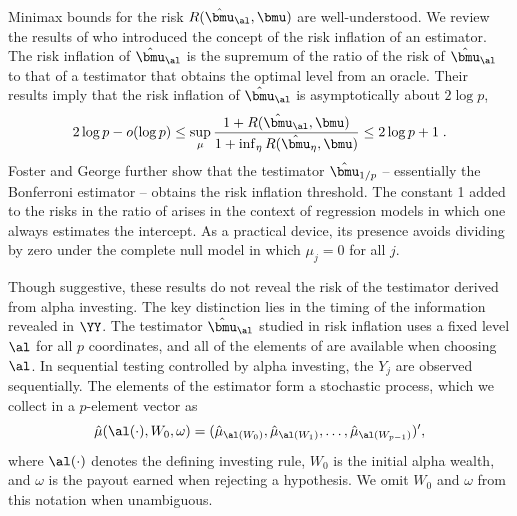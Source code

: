 \documentclass[12pt]{article}
\begin{document}
 Minimax bounds for the risk $R(\hat{\bmu}_\al,\bmu)$ are well-understood.  We
 review the results of \citet{fostergeorge94} who introduced the concept of the
 risk inflation of an estimator. \citep[][obtain similar results.]
  {donohojohnstone94} The risk inflation of $\hat{\bmu}_\al$ is the supremum of
 the ratio of the risk of $\hat{\bmu}_\al$ to that of a testimator that obtains
 the optimal level from an oracle.  Their results imply that the risk inflation
 of $\hat{\bmu}_\al$ is asymptotically about $2 \log p$,
 \begin{equation}
    2 \log p - o(\log p) 
    \le
    \sup_\mu  \frac{1 + R(\hat{\bmu}_\al,\bmu)}
                   {1 + \inf_\eta{R(\hat{\bmu}_\eta,\bmu)}}  
    \le 
    2 \log p + 1 \;.
 \label{eq:ri}
 \end{equation}
 Foster and George further show that the testimator $\hat{\bmu}_{1/p}$ --
 essentially the Bonferroni estimator -- obtains the risk inflation threshold.
  The constant 1 added to the risks in the ratio of  arises in the
 context of regression models in which one always estimates the intercept.  As a
 practical device, its presence avoids dividing by zero under the complete null
 model in which $\mu_j = 0$ for all $j$.


 Though suggestive, these results do not reveal the risk of the testimator
 derived from alpha investing.  The key distinction lies in the timing of the
 information revealed in $\YY$.  The testimator $\hat{\bmu}_\al$ studied in risk
 inflation uses a fixed level $\al$ for all $p$ coordinates, and all of the
 elements of \YY are available when choosing $\al$.  In sequential testing
 controlled by alpha investing, the $Y_j$ are observed sequentially.  The
 elements of the estimator form a stochastic process, which we collect in a
 $p$-element vector as
 \begin{equation}
   \hat\mu(\al(\cdot),W_0,\omega) = (\hat\mu_{\al(W_0)}, \hat\mu_{\al(W_1)}, \ldots, 
                       \hat\mu_{\al(W_{p-1})})',
 \label{eq:muHatAlphaInv}
 \end{equation}
 where $\al(\cdot)$ denotes the defining investing rule, $W_0$ is the initial
 alpha wealth, and $\omega$ is the payout earned when rejecting a hypothesis.
  We omit $W_0$ and $\omega$ from this notation when unambiguous.
 
\end{document}
